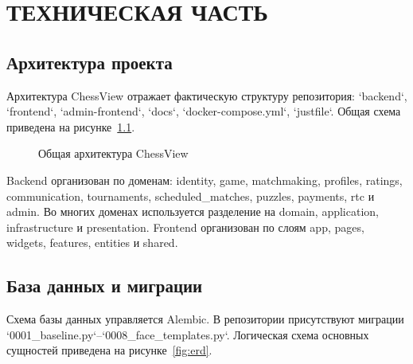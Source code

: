 \documentclass[14pt,a4paper]{extreport}
\begin{document}
\chapter{ТЕХНИЧЕСКАЯ ЧАСТЬ}

\section{Архитектура проекта}

Архитектура ChessView отражает фактическую структуру репозитория: `backend`, `frontend`, `admin-frontend`, `docs`, `docker-compose.yml`, `justfile`. Общая схема приведена на рисунке~\ref{fig:architecture}.

\begin{figure}[h]
\centering
{}
\caption{Общая архитектура ChessView}\label{fig:architecture}
\end{figure}

Backend организован по доменам: identity, game, matchmaking, profiles, ratings, communication, tournaments, scheduled\_matches, puzzles, payments, rtc и admin. Во многих доменах используется разделение на domain, application, infrastructure и presentation. Frontend организован по слоям app, pages, widgets, features, entities и shared.

\section{База данных и миграции}

Схема базы данных управляется Alembic. В репозитории присутствуют миграции `0001_baseline.py`--`0008_face_templates.py`. Логическая схема основных сущностей приведена на рисунке~\ref{fig:erd}.
\end{document}
